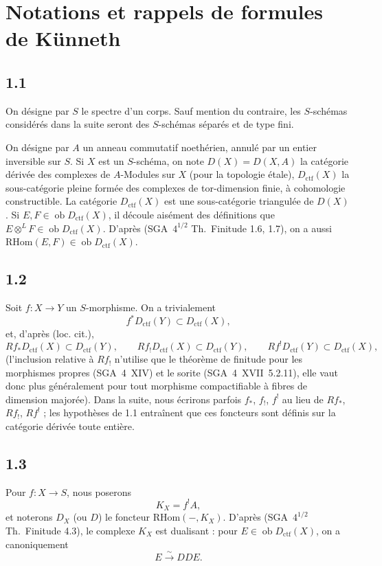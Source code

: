 \documentclass[11pt]{article}
\newcommand{\ob}{\operatorname{ob}}
\providecommand{\RHom}{\mathrm{RHom}}
\providecommand{\ctf}{\mathrm{ctf}}
\providecommand{\RHom}{\mathrm{RHom}}
\providecommand{\ob}{\operatorname{ob}}
\providecommand{\RHom}{\mathrm R\mathcal{H}om}
\providecommand{\RHom}{\mathrm{RHom}}
\begin{document}
\section{Notations et rappels de formules de Künneth}

\subsection*{1.1}
On désigne par $S$ le spectre d'un corps. Sauf mention du contraire, les $S$-schémas considérés dans la suite seront des $S$-schémas séparés et de type fini.

On désigne par $A$ un anneau commutatif noethérien, annulé par un entier inversible sur $S$. Si $X$ est un $S$-schéma, on note $D(X)=D(X,A)$ la catégorie dérivée des complexes de $A$-Modules sur $X$ (pour la topologie étale), $D_{\ctf}(X)$ la sous-catégorie pleine formée des complexes de tor-dimension finie, à cohomologie constructible. La catégorie $D_{\ctf}(X)$ est une sous-catégorie triangulée de $D(X)$. Si $E,F \in \ob D_{\ctf}(X)$, il découle aisément des définitions que $E \otimes^{L} F \in \ob D_{\ctf}(X)$. D'après (SGA~$4^{1/2}$ Th.~Finitude 1.6, 1.7), on a aussi $\RHom(E,F) \in \ob D_{\ctf}(X)$.

\subsection*{1.2}
Soit $f:X\to Y$ un $S$-morphisme. On a trivialement
\[
f^{*}D_{\ctf}(Y) \subset D_{\ctf}(X),
\]
et, d'après (loc. cit.),
\[
Rf_{*}D_{\ctf}(X) \subset D_{\ctf}(Y),\qquad
Rf_{!}D_{\ctf}(X) \subset D_{\ctf}(Y),\qquad
Rf^{!}D_{\ctf}(Y) \subset D_{\ctf}(X),
\]
(l'inclusion relative à $Rf_{!}$ n'utilise que le théorème de finitude pour les morphismes propres (SGA~4~XIV) et le sorite (SGA~4~XVII~5.2.11), elle vaut donc plus généralement pour tout morphisme compactifiable à fibres de dimension majorée). Dans la suite, nous écrirons parfois $f_{*}$, $f_{!}$, $f^{!}$ au lieu de $Rf_{*}$, $Rf_{!}$, $Rf^{!}$ ; les hypothèses de 1.1 entraînent que ces foncteurs sont définis sur la catégorie dérivée toute entière.

\subsection*{1.3}
Pour $f:X\to S$, nous poserons
\[
K_X=f^{!}A,
\]
et noterons $D_X$ (ou $D$) le foncteur $\RHom(-,K_X)$. D'après (SGA~$4^{1/2}$ Th.~Finitude 4.3), le complexe $K_X$ est dualisant : pour $E\in\ob D_{\ctf}(X)$, on a canoniquement
\[
E \xrightarrow{\sim} DDE.
\]
\end{document}
